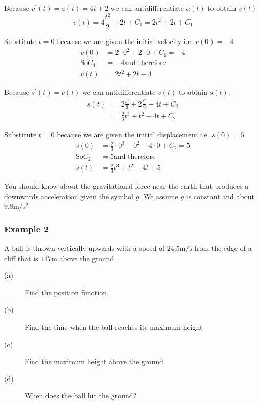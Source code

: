 Because $v^{ \prime } (t) =a (t) =4 t +2$ we can antidifferentiate $a (t)$ to obtain $v (t)$
\begin{equation*}v (t) =4 \frac{t^{2}}{2} +2 t +C_{1} =2 t^{2} +2 t +C_{1}
\end{equation*}

Substitute $t =0$ because we are given the initial velocity i.e. $v (0) = -4$
\begin{align*}v (0) &  = 2 \cdot 0^{2} +2 \cdot 0 +C_{1} = -4 \\
\text{So}C_{1} &  =  -4\text{and therefore} \\
v (t) &  = 2 t^{2} +2 t -4\end{align*}

Because $s^{ \prime } (t) =v (t)$ we can antidifferentiate $v (t)$ to obtain $s (t)$.
\begin{align*}s (t) &  = 2 \frac{t^{3}}{3} +2 \frac{t^{2}}{2} -4 t +C_{2} \\
 &  = \frac{2}{3} t^{3} +t^{2} -4 t +C_{2}\end{align*}

Substitute $t =0$ because we are given the initial displacement i.e. $s (0) =5$
\begin{align*}s (0) &  = \frac{2}{3} \cdot 0^{3} +0^{2} -4 \cdot 0 +C_{2} =5 \\
\text{So}C_{2} &  = 5\text{and therefore} \\
s (t) &  = \frac{2}{3} t^{3} +t^{2} -4 t +5\end{align*}

You should know about the gravitational force near the earth that produces a downwards acceleration
given the symbol $g$. We assume $g$ is constant and about $9.8 \mbox{m}$/$\mathrm{s}^{2}$ 

\subsubsection{Example 2}
A ball is thrown vertically upwards with a speed of $24.5 \mbox{m}$/$\mbox{s}$ from the edge of a cliff that is $147 \mbox{m}$ above the ground. 


\begin{description}
\item [(a)] Find the position function. 

\item [(b)]
Find the time when the ball reaches its maximum height 

\item [(c)]
Find the maximum height above the ground 

\item [(d)] When
does the ball hit the ground? \end{description}

